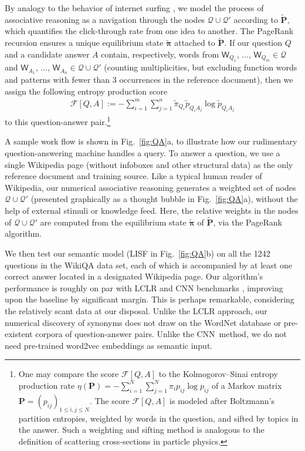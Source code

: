 \documentclass[10pt,journal,compsoc]{IEEEtran}
\begin{document}
By analogy to the behavior of internet surfing \cite{BrinPage1998,PageRank}, we model the process of associative reasoning \cite{Sloman1996} as a navigation through the nodes $\mathscr Q\cup\mathscr Q' $ according to  $ \mathbf {\widetilde P}$, which quantifies the click-through rate from one idea to another.
The Page\-Rank recursion \cite{PageRank} ensures a unique equilibrium state  $\bm{ \widetilde \pi}$ attached to $ \mathbf {\widetilde P}$. If our question $Q$ and a candidate answer  $A$ contain, respectively,  words from    $ \mathsf W_{Q_1}$, $\dots$, $\mathsf W_{Q_{m}}\in  \mathscr Q$ and  $ \mathsf W_{A_1}$, $\dots$, $\mathsf W_{A_{n}}\in  \mathscr Q\cup\mathscr Q' $ (counting multiplicities, but excluding function words and patterns with fewer than 3 occurrences in the reference document), then we assign the following entropy production score \begin{align}\mathscr F[Q,A]:=-\sum_{i=1}^m
\sum_{j=1}^{n}\widetilde \pi_{Q_i}\widetilde p_{Q_iA_j}\log\widetilde p_{Q_iA_j}\label{eq:sentence_score}\end{align}to  this question-answer pair.\footnote{One may compare the score $ \mathscr F[Q,A]$  to the Kolmogorov--Sinai entropy production rate \cite[(4.27)]{CoverThomas} $ \eta(\mathbf P)= -\sum_{i=1}^N\sum_{j=1}^N\pi_i p_{ij}\log p_{ij}$ of a Markov matrix $ \mathbf P=(p_{ij})_{1\leq i,j\leq N}$. The score  $ \mathscr F[Q,A] $  is modeled after Boltzmann's partition entropies, weighted by words in the question, and sifted by topics in the answer. Such a weighting and sifting method is analogous to the definition of scattering cross-sections in particle physics.}



 A sample work flow  is shown in Fig.~\ref{fig:QA}a,
to illustrate how our rudimentary question-answering machine  handles a query. To answer a question, we use    a single Wikipedia page (without infoboxes and other structural data)  as the only reference document and  training source.  Like a typical human reader of Wikipedia, our numerical associative reasoning generates a weighted set of nodes  $ \mathscr Q\cup\mathscr Q'$ (presented graphically as a thought bubble in Fig.~\ref{fig:QA}a), without the help of  external stimuli or knowledge feed. Here, the relative weights   in the nodes of   $ \mathscr Q\cup\mathscr Q'$  are computed from  the  equilibrium state  $\bm{ \widetilde \pi}$ of $ \mathbf {\widetilde P}$, via the  PageRank algorithm.




 We then  test our semantic model  (LISF in Fig.~\ref{fig:QA}b) on all the 1242 questions   in the   Wiki\-QA data set, each of which is accompanied by at least one correct
answer located in a designated Wikipedia page.
Our  algorithm's performance is  roughly on par with  LCLR   and CNN   benchmarks \cite{WikiQA},   improving upon the baseline by significant margin. This is perhaps remarkable, considering the relatively scant data at our disposal. Unlike the LCLR approach, our numerical discovery of synonyms does not draw on the WordNet database \cite{WordNet} or pre-existent corpora of question-answer pairs. Unlike the CNN\ method, we do not need pre-trained word2vec embeddings \cite{NIPS2013word2vec} as semantic input.
\end{document}
